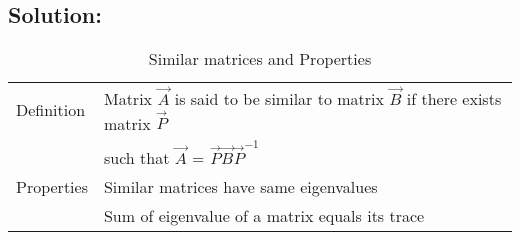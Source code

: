 \documentclass[journal,12pt,twocolumn]{IEEEtran}
\begin{document}
\subsection*{\textbf{Solution:}}
\begin{table}[h!]
\begin{center}
\begin{tabular}{|m{2cm}|m{6cm}|}\hline
        Definition & Matrix $\vec{A}$ is said to be similar to matrix $\vec{B}$ if there exists matrix $\vec{P}$\\& such that $\vec{A}$ = $\vec{P}\vec{B}\vec{P}^{-1}$\\
        \hline
        Properties & Similar matrices have same eigenvalues\\&
        Sum of eigenvalue of a matrix equals its trace\\
        \hline
\end{tabular}
\end{center}
\caption{Similar matrices and Properties}
\label{tab:my_label}
\end{table}
\end{document}
